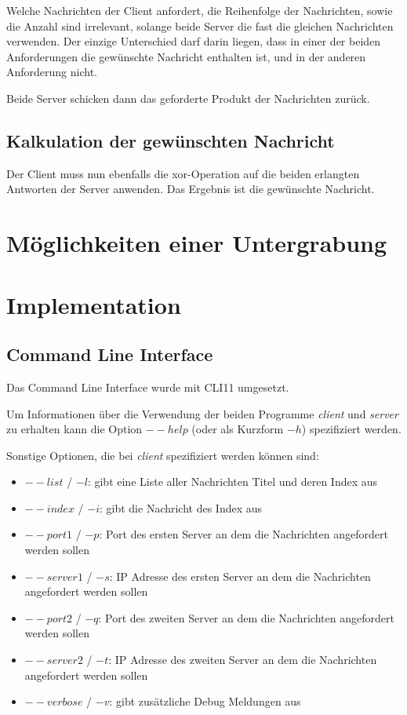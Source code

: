 \documentclass[]{article}
\begin{document}
Welche Nachrichten der Client anfordert, die Reihenfolge der Nachrichten, sowie die Anzahl sind irrelevant, solange beide Server die fast die gleichen Nachrichten verwenden. Der einzige Unterschied darf darin liegen, dass in einer der beiden Anforderungen die gewünschte Nachricht enthalten ist, und in der anderen Anforderung nicht.

Beide Server schicken dann das geforderte Produkt der Nachrichten zurück.

\subsection{Kalkulation der gewünschten Nachricht}
Der Client muss nun ebenfalls die xor-Operation auf die beiden erlangten Antworten der Server anwenden. Das Ergebnis ist die gewünschte Nachricht.

\section{Möglichkeiten einer Untergrabung}

\section{Implementation}
\subsection{Command Line Interface}
Das Command Line Interface wurde mit CLI11 umgesetzt.

Um Informationen über die Verwendung der beiden Programme \textit{client} und \textit{server} zu erhalten kann die Option $--help$ (oder als Kurzform $-h$) spezifiziert werden.

Sonstige Optionen, die bei \textit{client} spezifiziert werden können sind:

\begin{itemize}
	\item $--list$ / $-l$: gibt eine Liste aller Nachrichten Titel und deren Index aus
	\item $--index$ / $-i$: gibt die Nachricht des Index aus
	\item $--port1$ / $-p$: Port des ersten Server an dem die Nachrichten angefordert werden sollen
	\item $--server1$ / $-s$: IP Adresse des ersten Server an dem die Nachrichten angefordert werden sollen
	\item $--port2$ / $-q$: Port des zweiten Server an dem die Nachrichten angefordert werden sollen
	\item $--server2$ / $-t$: IP Adresse des zweiten Server an dem die Nachrichten angefordert werden sollen
	\item $--verbose$ / $-v$: gibt zusätzliche Debug Meldungen aus
\end{itemize}
\end{document}
